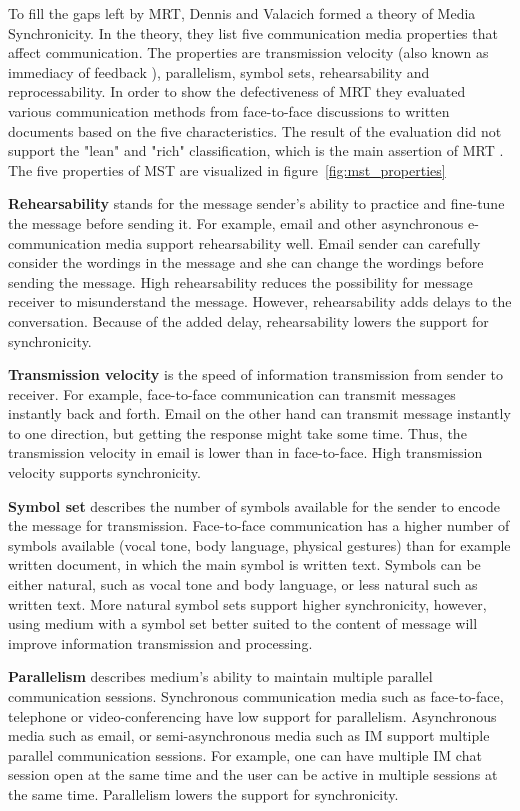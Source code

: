 \documentclass[english,12pt,a4paper,pdftex]{article}
\begin{document}
To fill the gaps left by \ac{MRT}, Dennis and Valacich formed a theory of Media Synchronicity. In the theory, they list five communication media properties that affect communication. The properties are transmission velocity (also known as immediacy of feedback \citep{dennis1999}), parallelism, symbol sets, rehearsability and reprocessability. In order to show the defectiveness of \ac{MRT} they evaluated various communication methods from face-to-face discussions to written documents based on the five characteristics. The result of the evaluation did not support the "lean" and "rich" classification, which is the main assertion of \ac{MRT} \citep{dennis2008}. The five properties of \ac{MST} are visualized in figure~\ref{fig:mst_properties}

\textbf{Rehearsability} stands for the message sender's ability to practice and fine-tune the message before sending it. For example, email and other asynchronous e-communication media support rehearsability well. Email sender can carefully consider the wordings in the message and she can change the wordings before sending the message. High rehearsability reduces the possibility for message receiver to misunderstand the message. However, rehearsability adds delays to the conversation. Because of the added delay, rehearsability lowers the support for synchronicity.

\textbf{Transmission velocity} is the speed of information transmission from sender to receiver. For example, face-to-face communication can transmit messages instantly back and forth. Email on the other hand can transmit message instantly to one direction, but getting the response might take some time. Thus, the transmission velocity in email is lower than in face-to-face. High transmission velocity supports synchronicity.

\textbf{Symbol set} describes the number of symbols available for the sender to encode the message for transmission. Face-to-face communication has a higher number of symbols available (vocal tone, body language, physical gestures) than for example written document, in which the main symbol is written text. Symbols can be either natural, such as vocal tone and body language, or less natural such as written text. More natural symbol sets support higher synchronicity, however, using medium with a symbol set better suited to the content of message will improve information transmission and processing.

\textbf{Parallelism} describes medium's ability to maintain multiple parallel communication sessions. Synchronous communication media such as face-to-face, telephone or video-conferencing have low support for parallelism. Asynchronous media such as email, or semi-asynchronous media such as \ac{IM} support multiple parallel communication sessions. For example, one can have multiple \ac{IM} chat session open at the same time and the user can be active in multiple sessions at the same time. Parallelism lowers the support for synchronicity.
\end{document}

